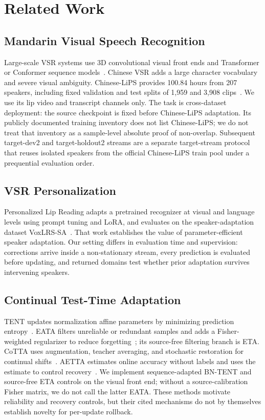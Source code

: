 \section{Related Work}
\label{sec:related_work}

\subsection{Mandarin Visual Speech Recognition}

Large-scale VSR systems use 3D convolutional visual front ends and Transformer or Conformer sequence models~\cite{ma2022visual}. Chinese VSR adds a large character vocabulary and severe visual ambiguity. Chinese-LiPS provides 100.84 hours from 207 speakers, including fixed validation and test splits of 1,959 and 3,908 clips~\cite{zhao2025chineselips}. We use its lip video and transcript channels only. The task is cross-dataset deployment: the source checkpoint is fixed before Chinese-LiPS adaptation. Its publicly documented training inventory does not list Chinese-LiPS; we do not treat that inventory as a sample-level absolute proof of non-overlap. Subsequent target-dev2 and target-holdout2 streams are a separate target-stream protocol that reuses isolated speakers from the official Chinese-LiPS train pool under a prequential evaluation order.

\subsection{VSR Personalization}

Personalized Lip Reading adapts a pretrained recognizer at visual and language levels using prompt tuning and LoRA, and evaluates on the speaker-adaptation dataset VoxLRS-SA~\cite{yeo2024personalized}. That work establishes the value of parameter-efficient speaker adaptation. Our setting differs in evaluation time and supervision: corrections arrive inside a non-stationary stream, every prediction is evaluated before updating, and returned domains test whether prior adaptation survives intervening speakers.

\subsection{Continual Test-Time Adaptation}

TENT updates normalization affine parameters by minimizing prediction entropy~\cite{wang2021tent}. EATA filters unreliable or redundant samples and adds a Fisher-weighted regularizer to reduce forgetting~\cite{niu2022eata}; its source-free filtering branch is ETA. CoTTA uses augmentation, teacher averaging, and stochastic restoration for continual shifts~\cite{wang2022cotta}. AETTA estimates online accuracy without labels and uses the estimate to control recovery~\cite{lee2024aetta}. We implement sequence-adapted BN-TENT and source-free ETA controls on the visual front end; without a source-calibration Fisher matrix, we do not call the latter EATA. These methods motivate reliability and recovery controls, but their cited mechanisms do not by themselves establish novelty for per-update rollback.

